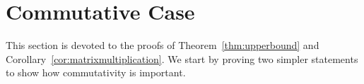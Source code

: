 \documentclass[a4paper,UKenglish,cleveref, autoref]{lipics-v2019}
\begin{document}





%
%
%
%
%
%

\section{Commutative Case}\label{sec-commutative}
This section is devoted to the proofs of Theorem~\ref{thm:upperbound} and Corollary~\ref{cor:matrixmultiplication}.
%
%
%
We start by proving two simpler statements to show
how commutativity is important.
\end{document}

